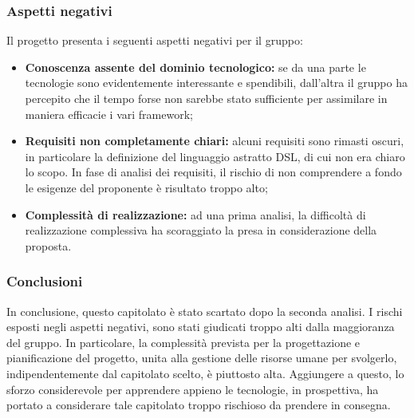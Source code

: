 \subsubsection{Aspetti negativi}
\label{aspettineg1}
Il progetto presenta i seguenti aspetti negativi per il gruppo:
\begin{itemize}
\item\textbf{Conoscenza assente del dominio tecnologico:} se da una parte le tecnologie sono evidentemente interessante e spendibili, dall'altra il gruppo ha percepito che il tempo forse non sarebbe stato sufficiente per assimilare in maniera efficacie i vari framework\glossario{};
\item\textbf{Requisiti non completamente chiari:} alcuni requisiti sono rimasti oscuri, in particolare la definizione del linguaggio astratto DSL, di cui non era chiaro lo scopo. In fase di analisi dei requisiti, il rischio di non comprendere a fondo le esigenze del proponente è risultato troppo alto;
\item\textbf{Complessità di realizzazione:} ad una prima analisi, la difficoltà di realizzazione complessiva ha scoraggiato la presa in considerazione della proposta.
\end{itemize}

\subsubsection{Conclusioni}
\label{conclusioni1}
In conclusione, questo capitolato è stato scartato dopo la seconda analisi. I rischi esposti negli aspetti negativi, sono stati giudicati troppo alti dalla maggioranza del gruppo. In particolare, la complessità prevista per la progettazione e pianificazione del progetto, unita alla gestione delle risorse umane per svolgerlo, indipendentemente dal capitolato scelto, è piuttosto alta. Aggiungere a questo, lo sforzo considerevole per apprendere appieno le tecnologie, in prospettiva, ha portato a considerare tale capitolato troppo rischioso da prendere in consegna.